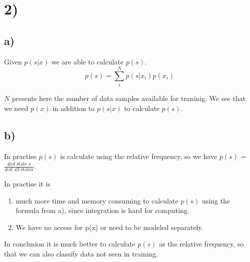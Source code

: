 \section*{2)} %
\label{sec:2_}

\subsection*{a)} %
\label{sub:a_}

Given $p(s|x)$ we are able to calculate $p(s)$.
\[
p(s) = \sum_i^N p(s|x_{i}) p(x_{i})
\]

$N$ presents here the number of data samples available for traninig.
We see that we need $p(x)$ in addition to $p(s|x)$ to calculate $p(s)$.

\subsection*{b)} %
\label{sub:b_}

In practise $p(s)$ is calculate using the relative frequency, 
so we have $p(s)$ = $\frac{\text{\# of state s}}{\text{\# of all states}}$.

In practise it is
\begin{enumerate}
	\item much more time and memory consuming to calculate $p(s)$ using
the formula from a), since integration is hard for computing.
	\item We have no access for p(x) or need to be modeled separately.
\end{enumerate}

In conclusion it is much better to calculate $p(s)$ as the relative frequency,
so that we can also classify data not seen in training. 
 

